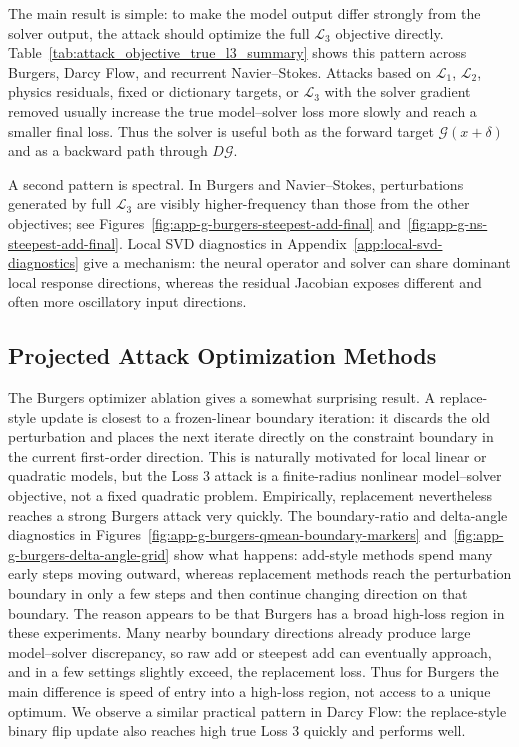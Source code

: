 \documentclass[letterpaper]{article} %
\newcommand{\figrefs}[2]{Figures~\ref{#1} and~\ref{#2}}
\newcommand{\tabref}[1]{Table~\ref{#1}}
\newcommand{\appref}[1]{Appendix~\ref{#1}}
\begin{document}
The main result is simple: to make the model output differ strongly from the
solver output, the attack should optimize the full $\mathcal{L}_3$ objective
directly. \tabref{tab:attack_objective_true_l3_summary} shows this pattern
across Burgers, Darcy Flow, and recurrent Navier--Stokes. Attacks based on
$\mathcal{L}_1$, $\mathcal{L}_2$, physics residuals, fixed or dictionary
targets, or $\mathcal{L}_3$ with the solver gradient removed usually increase
the true model--solver loss more slowly and reach a smaller final loss. Thus the
solver is useful both as the forward target $\mathcal{G}(x+\delta)$ and as a
backward path through $D\mathcal{G}$.

A second pattern is spectral. In Burgers and Navier--Stokes, perturbations
generated by full $\mathcal{L}_3$ are visibly higher-frequency than those from
the other objectives; see
\figrefs{fig:app-g-burgers-steepest-add-final}{fig:app-g-ns-steepest-add-final}.
Local SVD diagnostics in \appref{app:local-svd-diagnostics} give a mechanism:
the neural operator and solver can share dominant local response directions,
whereas the residual Jacobian exposes different and often more oscillatory
input directions.

\subsection{Projected Attack Optimization Methods}
\label{subsec:exp-projected-optimization}

The Burgers optimizer ablation gives a somewhat surprising result.  A
replace-style update is closest to a frozen-linear boundary iteration: it
discards the old perturbation and places the next iterate directly on the
constraint boundary in the current first-order direction.  This is naturally
motivated for local linear or quadratic models, but the Loss 3 attack is a
finite-radius nonlinear model--solver objective, not a fixed quadratic problem.
Empirically, replacement nevertheless reaches a strong Burgers attack very
quickly.  The boundary-ratio and delta-angle diagnostics in
\figrefs{fig:app-g-burgers-qmean-boundary-markers}{fig:app-g-burgers-delta-angle-grid}
show what happens: add-style methods spend many early steps moving outward,
whereas replacement methods reach the perturbation boundary in only a few steps
and then continue changing direction on that boundary.  The reason appears to
be that Burgers has a broad high-loss region in these experiments.  Many nearby
boundary directions already produce large model--solver discrepancy, so raw add
or steepest add can eventually approach, and in a few settings slightly exceed,
the replacement loss.  Thus for Burgers the main difference is speed of entry
into a high-loss region, not access to a unique optimum.  We observe a similar
practical pattern in Darcy Flow: the replace-style binary flip update also
reaches high true Loss 3 quickly and performs well.
\end{document}
